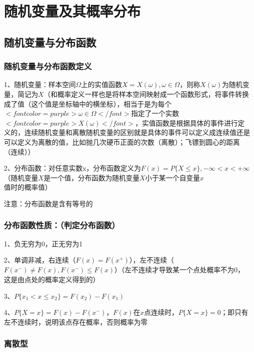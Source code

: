 \chapter{随机变量及其概率分布}

\section{随机变量与分布函数}



\subsection{随机变量与分布函数定义}

1、随机变量：样本空间$ \Omega $上的实值函数$ X=X(\omega), \omega \in \Omega $，则称$ X(\omega) $为随机变量，简记为$ X $（和概率定义一样也是将样本空间映射成一个函数形式，将事件转换成了值（这个值是坐标轴中的横坐标），相当于是为每个$ <font color=purple>\omega \in \Omega</font> $指定了一个实数$ <font color=purple>X(\omega)</font> $，实值函数是根据具体的事件进行定义的，连续随机变量和离散随机变量的区别就是具体的事件可以定义成连续值还是可以定义为离散的值，比如抛几次硬币正面的次数（离散）；飞镖到圆心的距离（连续））

2、分布函数：对任意实数x，分布函数定义为$ F(x) = P\{ X \le x\}, -\infty < x < +\infty $（随机变量$ X $是一个值，分布函数为随机变量$ X $小于某一个自变量$ x $值时的概率值）

注意：分布函数是含有等号的



\subsection{分布函数性质：（判定分布函数）}

1、负无穷为0，正无穷为1

2、单调非减，右连续（$ F(x)=F(x^+) $），左不连续（$  F(x^-) \ne F(x) , F(x^-) \le F(x)  $）（左不连续才导致某一个点处概率不为0，这是由点处的概率定义得到的）

3、$ P\{ x_1 < x \le x_2\} = F(x_2)-F(x_1) $

4、$ P\{X=x\} = F(x)-F(x^-) $，$ F(x) $在$ x $点连续时，$ P\{X=x\} = 0 $；即只有左不连续时，说明该点存在概率，否则概率为零



\subsection{离散型}

